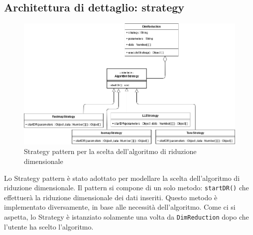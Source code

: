 \subsection{Architettura di dettaglio: strategy}
\begin{figure}[hb]
	\includegraphics[width=15.8cm]{Images/StrategyPattern.png}
	\centering
	\caption{Strategy pattern per la scelta dell'algoritmo di riduzione dimensionale}
\end{figure}
Lo Strategy pattern è stato adottato per modellare la scelta dell'algoritmo di riduzione dimensionale. Il pattern si compone di un solo metodo: \texttt{startDR()} che effettuerà la riduzione dimensionale dei dati inseriti. Questo metodo è implementato diversamente, in base alle necessità dell'algoritmo. Come ci si aspetta, lo Strategy è istanziato solamente una volta da \texttt{DimReduction} dopo che l'utente ha scelto l'algoritmo.